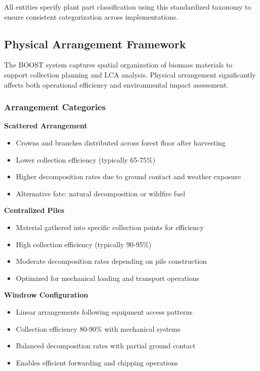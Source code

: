 \begin{normative}[title=Plant Part Classification Requirements]
All \TRU{} entities \MUST{} specify plant part classification using this standardized taxonomy to ensure consistent categorization across implementations.
\end{normative}

\subsection{Physical Arrangement Framework}
\label{sec:physical-arrangement}

The BOOST system captures spatial organization of biomass materials to support collection planning and LCA analysis. Physical arrangement significantly affects both operational efficiency and environmental impact assessment.

\subsubsection{Arrangement Categories}

\textbf{Scattered Arrangement}
\begin{itemize}
    \item Crowns and branches distributed across forest floor after harvesting
    \item Lower collection efficiency (typically 65-75\%)
    \item Higher decomposition rates due to ground contact and weather exposure
    \item Alternative fate: natural decomposition or wildfire fuel
\end{itemize}

\textbf{Centralized Piles}
\begin{itemize}
    \item Material gathered into specific collection points for efficiency
    \item High collection efficiency (typically 90-95\%)
    \item Moderate decomposition rates depending on pile construction
    \item Optimized for mechanical loading and transport operations
\end{itemize}

\textbf{Windrow Configuration}
\begin{itemize}
    \item Linear arrangements following equipment access patterns
    \item Collection efficiency 80-90\% with mechanical systems
    \item Balanced decomposition rates with partial ground contact
    \item Enables efficient forwarding and chipping operations
\end{itemize}

